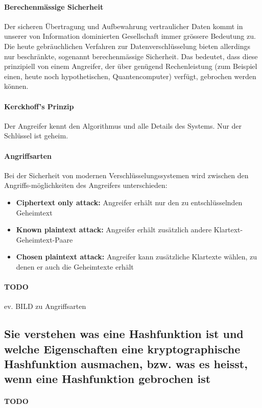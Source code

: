 \documentclass[10pt,a4paper]{article}
\begin{document}
\paragraph*{Berechenmässige Sicherheit}Der sicheren Übertragung und Aufbewahrung vertraulicher Daten kommt in unserer von Information dominierten Gesellschaft immer grössere Bedeutung zu. Die heute gebräuchlichen Verfahren zur Datenverschlüsselung bieten allerdings nur beschränkte, sogenannt berechenmässige Sicherheit. Das bedeutet, dass diese prinzipiell von einem Angreifer, der über genügend Rechenleistung (zum Beispiel einen, heute noch hypothetischen, Quantencomputer) verfügt, gebrochen werden können.
\paragraph*{Kerckhoff's Prinzip}Der Angreifer kennt den Algorithmus und alle Details des Systems. Nur der Schlüssel ist geheim.
\paragraph*{Angriffsarten}Bei der Sicherheit von modernen Verschlüsselungssystemen wird zwischen den Angriffs-möglichkeiten des Angreifers unterschieden:
\begin{itemize}[noitemsep,topsep=0pt,leftmargin=*]
    \item \textbf{Ciphertext only attack:} Angreifer erhält nur den zu entschlüsselnden Geheimtext
    \item \textbf{Known plaintext attack:} Angreifer erhält zusätzlich andere Klartext-Geheimtext-Paare
    \item \textbf{Chosen plaintext attack:} Angreifer kann zusätzliche Klartexte wählen, zu denen er auch die Geheimtexte erhält
\end{itemize}
\paragraph*{TODO}ev. BILD zu Angriffsarten

\subsection*{Sie verstehen was eine Hashfunktion ist und welche Eigenschaften eine kryptographische Hashfunktion ausmachen, bzw. was es heisst, wenn eine Hashfunktion gebrochen ist}
\paragraph*{TODO}
\end{document}
